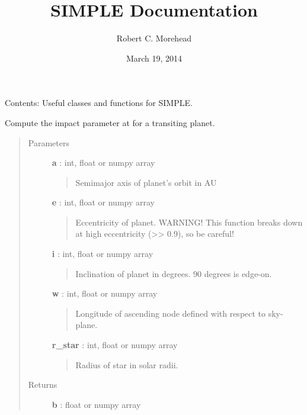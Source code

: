 \documentclass[letterpaper,10pt,english]{sphinxmanual}
\title{SIMPLE Documentation}
\date{March 19, 2014}
\author{Robert C. Morehead}
\begin{document}
\maketitle
\tableofcontents
{}\label{index::doc}


Contents:
\label{index:module-simple_lib}
Useful classes and functions for SIMPLE.

\begin{fulllineitems}
\label{index:simple_lib.impact_parameter}
Compute the impact parameter at for a transiting planet.
\begin{quote}\begin{description}
\item[{Parameters}] \leavevmode
\textbf{a} : int, float or numpy array
\begin{quote}

Semimajor axis of planet's orbit in AU
\end{quote}

\textbf{e} : int, float or numpy array
\begin{quote}

Eccentricity of planet. WARNING! This function breaks down at
high eccentricity (\textgreater{}\textgreater{} 0.9), so be careful!
\end{quote}

\textbf{i} : int, float or numpy array
\begin{quote}

Inclination of planet in degrees. 90 degrees is edge-on.
\end{quote}

\textbf{w} : int, float or numpy array
\begin{quote}

Longitude of ascending node defined with respect to sky-plane.
\end{quote}

\textbf{r\_star} : int, float or numpy array
\begin{quote}

Radius of star in solar radii.
\end{quote}

\item[{Returns}] \leavevmode
\textbf{b} : float or numpy array
\begin{quote}


\end{quote}
\end{description}
\end{quote}
\end{fulllineitems}
\end{document}
